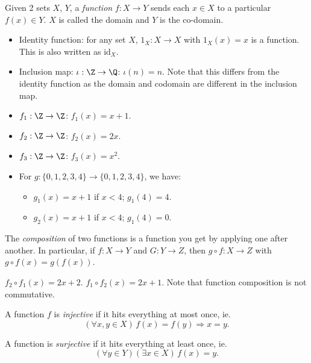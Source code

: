 \documentclass[a4paper]{article}
\begin{document}
\begin{defi}[Function]
  Given 2 sets $X$, $Y$, a \emph{function} $f: X \rightarrow Y$ sends each $x\in X$ to a particular $f(x)\in Y$. $X$ is called the domain and $Y$ is the co-domain.
\end{defi}
\begin{eg}\leavevmode
  \begin{itemize}
    \item Identity function: for any set $X$, $1_X: X \rightarrow X$ with $1_X(x) = x$ is a function. This is also written as $\mathrm{id}_X$.
    \item Inclusion map: $\iota: \Z \rightarrow \Q$: $\iota(n) = n$. Note that this differs from the identity function as the domain and codomain are different in the inclusion map.
    \item $f_1: \Z \rightarrow \Z$: $f_1(x) = x + 1$.
    \item $f_2: \Z \rightarrow \Z$: $f_2(x) = 2x$.
    \item $f_3: \Z \rightarrow \Z$: $f_3(x) = x^2$.
    \item For $g: \{0, 1, 2, 3, 4\} \rightarrow \{0, 1, 2, 3, 4\}$, we have:
      \begin{itemize}
        \item $g_1(x) = x + 1$ if $x < 4$; $g_1(4) = 4$.
        \item $g_2(x) = x + 1$ if $x < 4$; $g_1(4) = 0$.
      \end{itemize}
  \end{itemize}
\end{eg}
\begin{defi}
  The \emph{composition} of two functions is a function you get by applying one after another. In particular, if $f: X \rightarrow Y$ and $G: Y\rightarrow Z$, then $g\circ f: X \rightarrow Z$ with $g\circ f(x) = g(f(x))$.
\end{defi}
\begin{eg}
  $f_2\circ f_1(x) = 2x + 2$. $f_1\circ f_2 (x) = 2x + 1$. Note that function composition is not commutative.
\end{eg}
\begin{defi}
  A function $f$ is \emph{injective} if it hits everything at most once, ie.
  \[
    (\forall x, y\in X)\,f(x) = f(y)\Rightarrow x = y.
  \]
\end{defi}

\begin{defi}
  A function is \emph{surjective} if it hits everything at least once, ie.
  \[
    (\forall y\in Y)(\exists x\in X)\,f(x) = y.
  \]
\end{defi}
\end{document}
